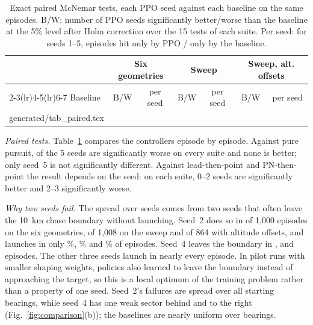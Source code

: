 \documentclass[conference]{IEEEtran}
\makeatletter
\newcommand{\tablerows}[1]{\@@input #1 }
\makeatother
\begin{document}
\begin{table}[t]
\centering
\caption{Exact paired McNemar tests, each PPO seed against each baseline on the same episodes. B/W: number of PPO seeds significantly better/worse than the baseline at the 5\% level after Holm correction over the 15 tests of each suite. Per seed: for seeds 1--5, episodes hit only by PPO / only by the baseline.}
\label{tab:paired}
\footnotesize
\setlength{\tabcolsep}{4pt}
\begin{tabular}{@{}lcccccc@{}}
\toprule
 & \multicolumn{2}{c}{Six geometries} & \multicolumn{2}{c}{Sweep} & \multicolumn{2}{c}{Sweep, alt. offsets} \\
\cmidrule(lr){2-3}\cmidrule(lr){4-5}\cmidrule(lr){6-7}
Baseline & B/W & per seed & B/W & per seed & B/W & per seed \\
\midrule
\tablerows{generated/tab_paired.tex}
\bottomrule
\end{tabular}
\end{table}

\emph{Paired tests.} Table~\ref{tab:paired} compares the controllers episode by episode. Against pure pursuit, \RSigSweepPureWorse{} of the 5 seeds are significantly worse on every suite and none is better; only seed~5 is not significantly different. Against lead-then-point and PN-then-point the result depends on the seed: on each suite, 0--2 seeds are significantly better and 2--3 significantly worse.

\emph{Why two seeds fail.} The spread over seeds comes from two seeds that often leave the 10~km chase boundary without launching. Seed~2 does so in \RPpoSeedTwoSixBoundary{} of 1,000 episodes on the six geometries, \RPpoSeedTwoSweepBoundary{} of 1,008 on the sweep and \RPpoSeedTwoAltBoundary{} of 864 with altitude offsets, and launches in only \RPpoSeedTwoSixLaunchShare\%, \RPpoSeedTwoSweepLaunchShare\% and \RPpoSeedTwoAltLaunchShare\% of episodes. Seed~4 leaves the boundary in \RPpoSeedFourSixBoundary, \RPpoSeedFourSweepBoundary{} and \RPpoSeedFourAltBoundary{} episodes. The other three seeds launch in nearly every episode. In pilot runs with smaller shaping weights, policies also learned to leave the boundary instead of approaching the target, so this is a local optimum of the training problem rather than a property of one seed. Seed~2's failures are spread over all starting bearings, while seed~4 has one weak sector behind and to the right (Fig.~\ref{fig:comparison}(b)); the baselines are nearly uniform over bearings.
\end{document}

